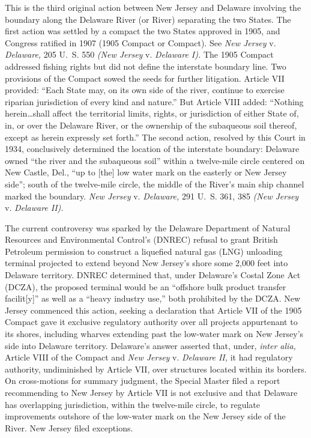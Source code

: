 
\setcounter{page}{597}

  This is the third original action between New Jersey and Delaware
involving the boundary along the Delaware River (or River) separating
the two States. The first action was settled by a compact the two
States approved in 1905, and Congress ratified in 1907 (1905 Compact or
Compact). See \emph{New Jersey} v. \emph{Delaware,} 205 U.~S. 550 \emph{(New
Jersey} v. \emph{Delaware I).} The 1905 Compact addressed fishing rights
but did not define the interstate boundary line. Two provisions of the
Compact sowed the seeds for further litigation. Article VII provided:
``Each State may, on its own side of the river, continue to exercise
riparian jurisdiction of every kind and nature.'' But Article VIII
added: ``Nothing herein\dots shall affect the territorial limits,
rights, or jurisdiction of either State of, in, or over the Delaware
River, or the ownership of the subaqueous soil thereof, except as
herein expressly set forth.'' The second action, resolved by this
Court in 1934, conclusively determined the location of the interstate
boundary: Delaware owned ``the river and the subaqueous soil'' within
a twelve-mile circle centered on New Castle, Del., ``up to [the]
low water mark on the easterly or New Jersey side''; south of the
twelve-mile circle, the middle of the River's main ship channel marked
the boundary. \emph{New Jersey} v. \emph{Delaware,} 291 U.~S. 361, 385
\emph{(New Jersey} v. \emph{Delaware II).}

  The current controversy was sparked by the Delaware Department of
Natural Resources and Environmental Control's (DNREC) refusal to grant
British Petroleum permission to construct a liquefied natural gas (LNG)
unloading terminal projected to extend beyond New Jersey's shore
some 2,000 feet into Delaware territory. DNREC determined that, under
Delaware's Costal Zone Act (DCZA), the proposed terminal would be an
``offshore bulk product transfer facilit[y]'' as well as a ``heavy
industry use,'' both prohibited by the DCZA. New Jersey commenced this
action, seeking a declaration that Article VII of the 1905 Compact
gave it exclusive regulatory authority over all projects appurtenant
to its shores, including wharves extending past the low-water mark
on New Jersey's side into Delaware territory. Delaware's answer
asserted that, under, \emph{inter alia,} Article VIII of the Compact
and \emph{New Jersey} v. \emph{Delaware II,} it had regulatory authority,
undiminished by Article VII, over structures located within its borders.
On cross-motions for summary judgment, the Special Master filed a report
recommending \newpage  to New Jersey by Article VII is not exclusive and
that Delaware has overlapping jurisdiction, within the twelve-mile
circle, to regulate improvements outshore of the low-water mark on the
New Jersey side of the River. New Jersey filed exceptions.

